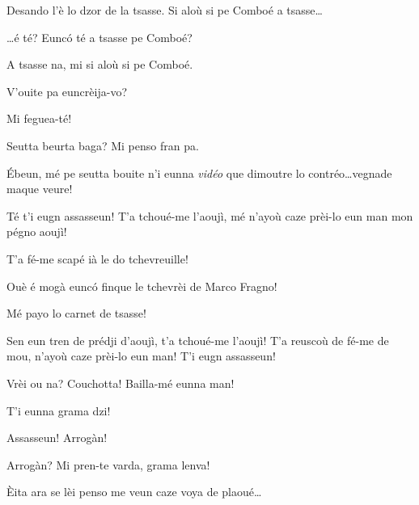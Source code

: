 \begin{drama}
\Tuenospeaks Desando l'è lo dzor de la tsasse. Si aloù si pe Comboé a tsasse\ldots

\Saventaspeaks{} \ldots é té? Eunc\'o té a tsasse pe Comboé?

\Richardspeaks A tsasse na, mi si aloù si pe Comboé.

\Saventaspeaks V'ouite pa euncrèija-vo?

\Richardspeaks Mi feguea-té!

\Tuenospeaks{} Seutta beurta baga? Mi penso fran pa.

\Saventaspeaks \'Ebeun, mé pe seutta bouite  n'i eunna \textit{vidéo} que dimoutre lo contréo\ldots vegnade maque veure! 





\Richardspeaks Té t'i eugn assasseun! T'a tchoué-me l'aoujì, mé n'ayoù caze prèi-lo eun man mon pégno aoujì!

\Tuenospeaks T'a fé-me scapé ià le do tchevreuille!

\Richardspeaks Ouè é mogà eunc\'o finque le tchevrèi de Marco Fragno!

\Tuenospeaks Mé payo lo carnet de tsasse!

\Richardspeaks Sen eun tren de prédji d'aoujì, t'a tchoué-me l'aoujì! T'a reuscoù de fé-me de mou, n'ayoù caze prèi-lo eun man! T'i eugn assasseun!

\Richardspeaks{} Vrèi ou na? Couchotta! Bailla-mé eunna man!

\Gerominespeaks{} T'i eunna grama dzi!

\Richardspeaks Assasseun! Arrogàn!


\Tuenospeaks Arrogàn? Mi pren-te varda, grama lenva!

\Richardspeaks \`Eita ara se lèi penso me veun caze voya de plaoué\ldots


\end{drama}

